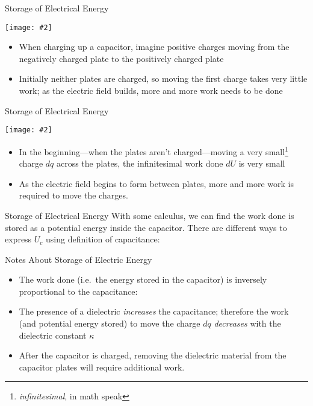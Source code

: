 \documentclass[12pt,aspectratio=169]{beamer}
\newcommand{\pic}[2]{\texttt{[image: \#2]}}
\newcommand{\eq}[2]{\vspace{#1}{\Large\begin{displaymath}#2\end{displaymath}}}
\begin{document}
\begin{frame}{Storage of Electrical Energy}
  \begin{center}
    \pic{.45}{slide14}
  \end{center}
  \begin{itemize}
  \item When charging up a capacitor, imagine positive charges moving from the
    negatively charged plate to the positively charged plate
  \item Initially neither plates are charged, so moving the first charge takes
    very little work; as the electric field builds, more and more work needs
    to be done
  \end{itemize}
\end{frame}



\begin{frame}{Storage of Electrical Energy}
  \begin{center}
    \pic{.35}{slide14}
  \end{center}
  \begin{itemize}
  \item In the beginning---when the plates aren't charged---moving a very
    small\footnote{\emph{infinitesimal}, in math speak} charge $dq$ across
    the plates, the infinitesimal work done $dU$ is very small
  \item As the electric field begins to form between plates, more and more work
    is required to move the charges.
  \end{itemize}
\end{frame}



\begin{frame}{Storage of Electrical Energy}
%
%
  With some calculus, we can find the work done is stored as a potential energy
  inside the capacitor. There are different ways to express $U_c$ using
  definition of capacitance:

  \eq{-.15in}{
    \boxed{U_c=\frac12\frac{Q^2}{C}=\frac12QV=\frac12CV^2}
  }
\end{frame}




\begin{frame}{Notes About Storage of Electric Energy}
  \begin{itemize}
  \item The work done (i.e.\ the energy stored in the capacitor) is inversely
    proportional to the capacitance:

    \eq{-.2in}{
      dU=Vdq=\frac{q}{C}dq
    }
  \item The presence of a dielectric \emph{increases} the capacitance; therefore
    the work (and potential energy stored) to move the charge $dq$
    \emph{decreases} with the dielectric constant $\kappa$
  \item After the capacitor is charged, removing the dielectric material from
    the capacitor plates will require additional work.
  \end{itemize}
\end{frame}
\end{document}
